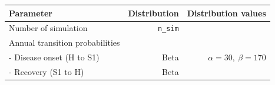 \documentclass[
]{article}
\begin{document}
\begin{longtable}[]{@{}lrr@{}}
\toprule
\begin{minipage}[b]{0.32\columnwidth}\raggedright
\textbf{Parameter}\strut
\end{minipage} & \begin{minipage}[b]{0.17\columnwidth}\raggedleft
\textbf{Distribution}\strut
\end{minipage} & \begin{minipage}[b]{0.42\columnwidth}\raggedleft
\textbf{Distribution values}\strut
\end{minipage}\tabularnewline
\midrule
\endhead
\begin{minipage}[t]{0.32\columnwidth}\raggedright
Number of simulation\strut
\end{minipage} & \begin{minipage}[t]{0.17\columnwidth}\raggedleft
\texttt{n\_sim}\strut
\end{minipage} & \begin{minipage}[t]{0.42\columnwidth}\raggedleft
1000\strut
\end{minipage}\tabularnewline
\begin{minipage}[t]{0.32\columnwidth}\raggedright
Annual transition probabilities\strut
\end{minipage} & \begin{minipage}[t]{0.17\columnwidth}\raggedleft
\strut
\end{minipage} & \begin{minipage}[t]{0.42\columnwidth}\raggedleft
\strut
\end{minipage}\tabularnewline
\begin{minipage}[t]{0.32\columnwidth}\raggedright
- Disease onset (H to S1)\strut
\end{minipage} & \begin{minipage}[t]{0.17\columnwidth}\raggedleft
Beta\strut
\end{minipage} & \begin{minipage}[t]{0.42\columnwidth}\raggedleft
\(\alpha=30, \ \beta=170\)\strut
\end{minipage}\tabularnewline
\begin{minipage}[t]{0.32\columnwidth}\raggedright
- Recovery (S1 to H)\strut
\end{minipage} & \begin{minipage}[t]{0.17\columnwidth}\raggedleft
Beta\strut
\end{minipage} & \begin{minipage}[t]{0.42\columnwidth}\raggedleft

\end{minipage}
\end{longtable}
\end{document}
